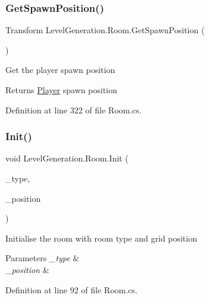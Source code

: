 \subsubsection{\texorpdfstring{Get\+Spawn\+Position()}{GetSpawnPosition()}}
{\footnotesize\ttfamily Transform Level\+Generation.\+Room.\+Get\+Spawn\+Position (\begin{DoxyParamCaption}{ }\end{DoxyParamCaption})}



Get the player spawn position 

\begin{DoxyReturn}{Returns}
\mbox{\hyperlink{class_player}{Player}} spawn position
\end{DoxyReturn}


Definition at line 322 of file Room.\+cs.

\mbox{\label{class_level_generation_1_1_room_ac54baebea1ec085f79843e5c42a66467}} 
\subsubsection{\texorpdfstring{Init()}{Init()}}
{\footnotesize\ttfamily void Level\+Generation.\+Room.\+Init (\begin{DoxyParamCaption}\item[{\mbox{\hyperlink{namespace_level_generation_a206451e0c8bfced86ae4b9348cd3718f}{Room\+Type}}}]{\+\_\+type,  }\item[{Vector2\+Int}]{\+\_\+position }\end{DoxyParamCaption})}



Initialise the room with room type and grid position 


\begin{DoxyParams}{Parameters}
{\em \+\_\+type} & \\
\hline
{\em \+\_\+position} & \\
\hline
\end{DoxyParams}


Definition at line 92 of file Room.\+cs.

\mbox{\label{class_level_generation_1_1_room_ae6cd86347ce784fab849c28cf4a70be9}} 
